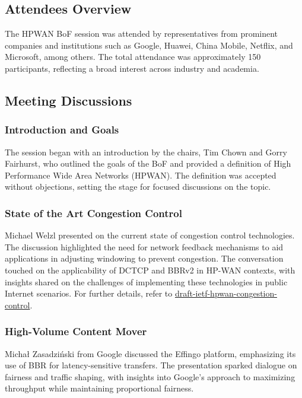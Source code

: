 \documentclass{article}
\begin{document}
\subsection{Attendees Overview}
The HPWAN BoF session was attended by representatives from prominent companies and institutions such as Google, Huawei, China Mobile, Netflix, and Microsoft, among others. The total attendance was approximately 150 participants, reflecting a broad interest across industry and academia.

\subsection{Meeting Discussions}

\subsubsection{Introduction and Goals}
The session began with an introduction by the chairs, Tim Chown and Gorry Fairhurst, who outlined the goals of the BoF and provided a definition of High Performance Wide Area Networks (HPWAN). The definition was accepted without objections, setting the stage for focused discussions on the topic.

\subsubsection{State of the Art Congestion Control}
Michael Welzl presented on the current state of congestion control technologies. The discussion highlighted the need for network feedback mechanisms to aid applications in adjusting windowing to prevent congestion. The conversation touched on the applicability of DCTCP and BBRv2 in HP-WAN contexts, with insights shared on the challenges of implementing these technologies in public Internet scenarios. For further details, refer to \href{https://datatracker.ietf.org/doc/html/draft-ietf-hpwan-congestion-control}{draft-ietf-hpwan-congestion-control}.

\subsubsection{High-Volume Content Mover}
Michał Zasadziński from Google discussed the Effingo platform, emphasizing its use of BBR for latency-sensitive transfers. The presentation sparked dialogue on fairness and traffic shaping, with insights into Google's approach to maximizing throughput while maintaining proportional fairness.
\end{document}
